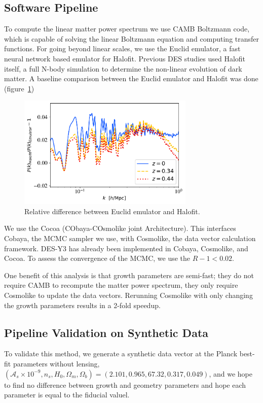 \subsection{Software Pipeline}
To compute the linear matter power spectrum we use \textsc{CAMB} Boltzmann code, which is capable of solving the linear Boltzmann equation and computing transfer functions. For going beyond linear scales, we use the Euclid emulator, a fast neural network based emulator for Halofit. Previous DES studies used Halofit itself, a full N-body simulation to determine the non-linear evolution of dark matter. A baseline comparison between the Euclid emulator and Halofit was done (figure~\ref{fig:euc_v_halo})
\begin{figure}[ht]
	\centering
	\includegraphics[width=0.75\textwidth]{plots/halo_vs_emu.pdf}
	\caption{Relative difference between Euclid emulator and Halofit.}
	\label{fig:euc_v_halo}
\end{figure}
We use the Cocoa (CObaya-COsmolike joint Architecture). This interfaces Cobaya, the MCMC sampler we use, with Cosmolike, the data vector calculation framework. DES-Y3 has already been implemented in Cobaya, Cosmolike, and Cocoa. To assess the convergence of the MCMC, we use the $R-1<0.02$.

One benefit of this analysis is that growth parameters are semi-fast; they do not require CAMB to recompute the matter power spectrum, they only require Cosmolike to update the data vectors. Rerunning Cosmolike with only changing the growth parameters results in a 2-fold speedup.
\subsection{Pipeline Validation on Synthetic Data}
To validate this method, we generate a synthetic data vector at the Planck best-fit parameters without lensing, $(\mathcal{A}_s\times10^{-9}, n_s, H_0, \Omega_m, \Omega_b) = (2.101,0.965,67.32,0.317,0.049)$, and we hope to find no difference between growth and geometry parameters and hope each parameter is equal to the fiducial valuel.

